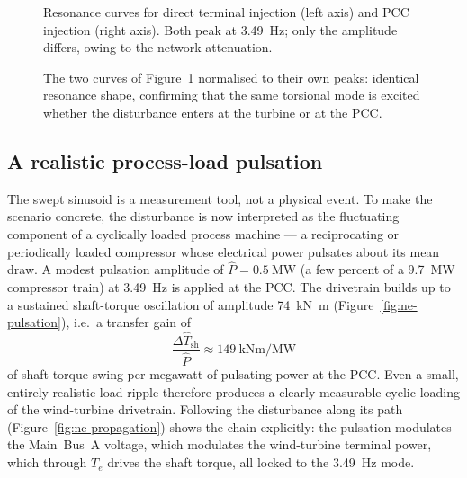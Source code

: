 \begin{figure}[t]
  \centering
  \caption{Resonance curves for direct terminal injection (left axis) and
  PCC injection (right axis). Both peak at \SI{3.49}{\hertz}; only the amplitude
  differs, owing to the network attenuation.}
  \label{fig:ne-compare}
\end{figure}

\begin{figure}[t]
  \centering
  \caption{The two curves of Figure~\ref{fig:ne-compare} normalised to their own
  peaks: identical resonance shape, confirming that the same torsional mode is
  excited whether the disturbance enters at the turbine or at the PCC.}
  \label{fig:ne-normalized}
\end{figure}

\subsection{A realistic process-load pulsation}
\label{subsec:ne-pulsation}

The swept sinusoid is a measurement tool, not a physical event. To make the
scenario concrete, the disturbance is now interpreted as the fluctuating
component of a cyclically loaded process machine --- a reciprocating or
periodically loaded compressor whose electrical power pulsates about its mean
draw. A modest pulsation amplitude of $\hat{P}=\SI{0.5}{\mega\watt}$ (a few
percent of a \SI{9.7}{\mega\watt} compressor train) at \SI{3.49}{\hertz} is
applied at the PCC. The drivetrain builds up to a sustained shaft-torque
oscillation of amplitude \SI{74}{\kilo\newton\metre}
(Figure~\ref{fig:ne-pulsation}), i.e.\ a transfer gain of
\begin{equation}
  \frac{\Delta \hat{T}_{\mathrm{sh}}}{\hat{P}}
  \approx \SI{149}{\kilo\newton\metre\per\mega\watt}
  \label{eq:ne-gain}
\end{equation}
of shaft-torque swing per megawatt of pulsating power at the PCC. Even a small,
entirely realistic load ripple therefore produces a clearly measurable cyclic
loading of the wind-turbine drivetrain. Following the disturbance along its path
(Figure~\ref{fig:ne-propagation}) shows the chain explicitly: the pulsation
modulates the Main~Bus~A voltage, which modulates the wind-turbine terminal
power, which through $T_e$ drives the shaft torque, all locked to the
\SI{3.49}{\hertz} mode.

